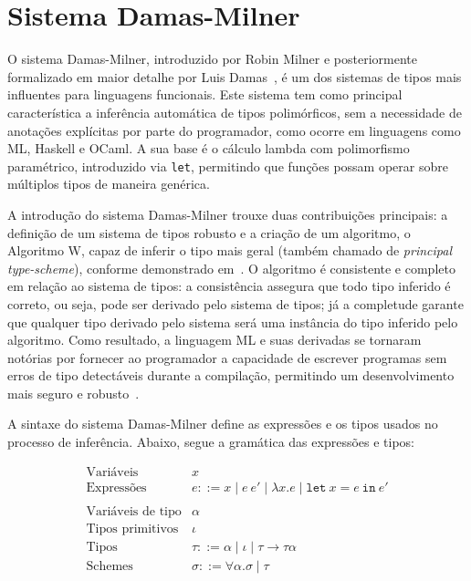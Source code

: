 \section{Sistema Damas-Milner}\label{sec:damas-milner}

O sistema Damas-Milner, introduzido por Robin Milner e posteriormente formalizado em maior detalhe por Luis Damas~\cite{MILNER1978, DAMAS1982}, é um dos sistemas de tipos mais influentes para linguagens funcionais.
Este sistema tem como principal característica a inferência automática de tipos polimórficos, sem a necessidade de anotações explícitas por parte do programador, como ocorre em linguagens como ML, Haskell e OCaml.
A sua base é o cálculo lambda com polimorfismo paramétrico, introduzido via \texttt{let}, permitindo que funções possam operar sobre múltiplos tipos de maneira genérica.

A introdução do sistema Damas-Milner trouxe duas contribuições principais: a definição de um sistema de tipos robusto e a criação de um algoritmo, o Algoritmo W, capaz de inferir o tipo mais geral (também chamado de \textit{principal type-scheme}), conforme demonstrado em~.
O algoritmo é consistente e completo em relação ao sistema de tipos: a consistência assegura que todo tipo inferido é correto, ou seja, pode ser derivado pelo sistema de tipos; já a completude garante que qualquer tipo derivado pelo sistema será uma instância do tipo inferido pelo algoritmo.
Como resultado, a linguagem ML e suas derivadas se tornaram notórias por fornecer ao programador a capacidade de escrever programas sem erros de tipo detectáveis durante a compilação, permitindo um desenvolvimento mais seguro e robusto~\cite{MILNER1978, DAMAS1984}.

A sintaxe do sistema Damas-Milner define as expressões e os tipos usados no processo de inferência.
Abaixo, segue a gramática das expressões e tipos:

\begin{equation}\label{eq:dm-syntax}
  \begin{array}{ll}
    \text{Variáveis}         & x                                                                                 \\
    \text{Expressões}        & e ::= x \mid e \ e' \mid \lambda x.e \mid \texttt{let} \ x = e \ \texttt{in} \ e' \\
    \\
    \text{Variáveis de tipo} & \alpha                                                                            \\
    \text{Tipos primitivos}  & \iota                                                                             \\
    \text{Tipos}             & \tau ::= \alpha \mid \iota \mid \tau \rightarrow \tau
    \alpha                                                                                                       \\
    \text{Schemes}           & \sigma ::= \forall \alpha. \sigma \mid \tau                                       \\
  \end{array}
\end{equation}

